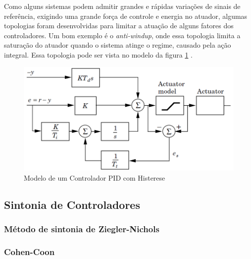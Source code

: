 Como alguns sistemas podem admitir grandes e rápidas variações de sinais de referência, exigindo uma grande força de controle e energia no atuador, algumas topologias foram desenvolvidas para limitar a atuação de alguns fatores dos controladores. Um bom exemplo é o \textit{anti-windup}, onde essa topologia limita a saturação do atuador quando o sistema atinge o regime, causado pela ação integral. Essa topologia pode ser vista no modelo da figura \ref{fig:pid_antiwindup_astrom_p83} \cite{Astrom1995}.

\begin{figure}[h!]
  \caption{Modelo de um Controlador PID com Histerese}
  \begin{center}
      \includegraphics[scale=0.65]{img/pid_antiwindup_astrom_p83}
  \end{center}
  \label{fig:pid_antiwindup_astrom_p83}
\end{figure}


\subsection{Sintonia de Controladores}



\subsubsection{Método de sintonia de Ziegler-Nichols}

\subsubsection{Cohen-Coon}

